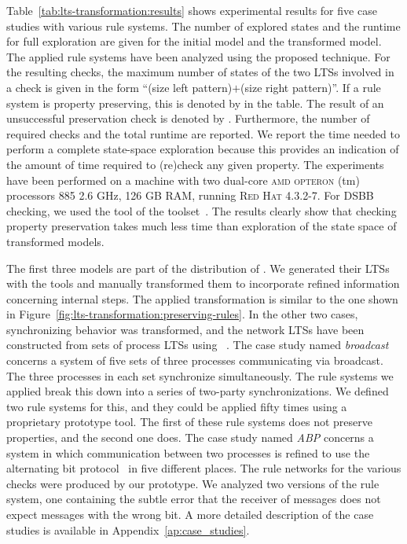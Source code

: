 Table~\ref{tab:lts-transformation:results} shows experimental results for five case studies with various rule systems.
The number of explored states and the runtime for full exploration are given for the initial model and the transformed model.
The applied rule systems have been analyzed using the proposed technique.
For the resulting checks, the maximum number of states of the two LTSs involved in a check is given in the form ``(size left pattern)$+$(size right pattern)''.
If a rule system is property preserving, this is denoted by \accept in the table.
The result of an unsuccessful preservation check is denoted by \reject.
Furthermore, the number of required checks and the total runtime are reported.
We report the time needed to perform a complete state-space exploration because this provides an indication of the amount of time required to (re)check any given property.
The experiments have been performed on a machine with two dual-core \textsc{amd opteron} (tm) processors 885 2.6 GHz, 126 GB RAM, running \textsc{Red Hat} 4.3.2-7.
For DSBB checking, we used the \ltscompare tool of the \mCRLTwo toolset~\cite{mcrl2}.
The results clearly show that checking property preservation takes much less time than exploration of the state space of transformed models.

The first three models are part of the distribution of \mCRLTwo.
We generated their LTSs with the \mCRLTwo tools and manually transformed them to incorporate refined information concerning internal steps.
The applied transformation is similar to the one shown in Figure~\ref{fig:lts-transformation:preserving-rules}.
In the other two cases, synchronizing behavior was transformed, and the network LTSs have been constructed from sets of process LTSs using \EXPOPEN~\cite{lang05}.
The case study named {\it broadcast} concerns a system of five sets of three processes communicating via broadcast.
The three processes in each set synchronize simultaneously.
The rule systems we applied break this down into a series of two-party synchronizations.
We defined two rule systems for this, and they could be applied fifty times using a proprietary prototype tool.
The first of these rule systems does not preserve properties, and the second one does.
The case study named {\it ABP} concerns a system in which communication between two processes is refined to use the alternating bit protocol~\cite{Bartlett1969} in five different places.
The rule networks for the various checks were produced by our prototype.
We analyzed two versions of the rule system, one containing the subtle error that the receiver of messages does not expect messages with the wrong bit.
A more detailed description of the case studies is available in Appendix~\ref{ap:case_studies}. 